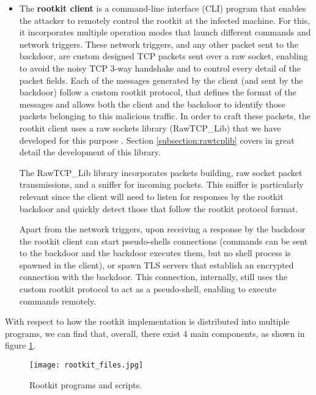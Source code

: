 \begin{itemize}
\item The \textbf{rootkit client} is a command-line interface (CLI) program that enables the attacker to remotely control the rootkit at the infected machine. For this, it incorporates multiple operation modes that launch different commands and network triggers. These network triggers, and any other packet sent to the backdoor, are custom designed TCP packets sent over a raw socket, enabling to avoid the noisy TCP 3-way handshake and to control every detail of the packet fields. Each of the messages generated by the client (and sent by the backdoor) follow a custom rootkit protocol, that defines the format of the messages and allows both the client and the backdoor to identify those packets belonging to this malicious traffic. In order to craft these packets, the rootkit client uses a raw sockets library (RawTCP\_Lib) that we have developed for this purpose \cite{rawtcp_lib}. Section \ref{subsection:rawtcplib} covers in great detail the development of this library.

The RawTCP\_Lib library incorporates packets building, raw socket packet transmissions, and a sniffer for incoming packets. This sniffer is particularly relevant since the client will need to listen for responses by the rootkit backdoor and quickly detect those that follow the rootkit protocol format.

Apart from the network triggers, upon receiving a response by the backdoor the rootkit client can start pseudo-shells connections (commands can be sent to the backdoor and the backdoor executes them, but no shell process is spawned in the client), or spawn TLS servers that establish an encrypted connection with the backdoor. This connection, internally, still uses the custom rootkit protocol to act as a pseudo-shell, enabling to execute commands remotely.
\end{itemize}


With respect to how the rootkit implementation is distributed into multiple programs, we can find that, overall, there exist 4 main components, as shown in figure \ref{fig:rootkit_files}.

\begin{figure}[htbp]
	\centering
	\texttt{[image: rootkit\_files.jpg]}
	\caption{Rootkit programs and scripts.}
	\label{fig:rootkit_files}
\end{figure}

